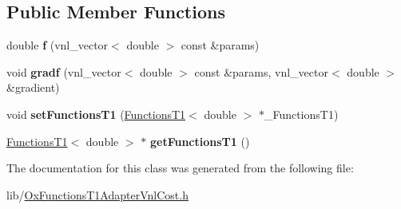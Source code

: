 \subsection*{Public Member Functions}
\begin{DoxyCompactItemize}
\item 
\hypertarget{class_ox_1_1_functions_t1_adapter_vnl_cost_ae74d956d16b010a32cfabda090674d4b}{double {\bfseries f} (vnl\-\_\-vector$<$ double $>$ const \&params)}\label{class_ox_1_1_functions_t1_adapter_vnl_cost_ae74d956d16b010a32cfabda090674d4b}

\item 
\hypertarget{class_ox_1_1_functions_t1_adapter_vnl_cost_a6a147aabdfb2c40916fe353044739484}{void {\bfseries gradf} (vnl\-\_\-vector$<$ double $>$ const \&params, vnl\-\_\-vector$<$ double $>$ \&gradient)}\label{class_ox_1_1_functions_t1_adapter_vnl_cost_a6a147aabdfb2c40916fe353044739484}

\item 
\hypertarget{class_ox_1_1_functions_t1_adapter_vnl_cost_a42a684f88c04d8b1bfafeb010a27a6fd}{void {\bfseries set\-Functions\-T1} (\hyperlink{class_ox_1_1_functions_t1}{Functions\-T1}$<$ double $>$ $\ast$\-\_\-\-Functions\-T1)}\label{class_ox_1_1_functions_t1_adapter_vnl_cost_a42a684f88c04d8b1bfafeb010a27a6fd}

\item 
\hypertarget{class_ox_1_1_functions_t1_adapter_vnl_cost_a8550e4df6a10d70787dbbdd92b319d97}{\hyperlink{class_ox_1_1_functions_t1}{Functions\-T1}$<$ double $>$ $\ast$ {\bfseries get\-Functions\-T1} ()}\label{class_ox_1_1_functions_t1_adapter_vnl_cost_a8550e4df6a10d70787dbbdd92b319d97}

\end{DoxyCompactItemize}


The documentation for this class was generated from the following file\-:\begin{DoxyCompactItemize}
\item 
lib/\hyperlink{_ox_functions_t1_adapter_vnl_cost_8h}{Ox\-Functions\-T1\-Adapter\-Vnl\-Cost.\-h}\end{DoxyCompactItemize}
